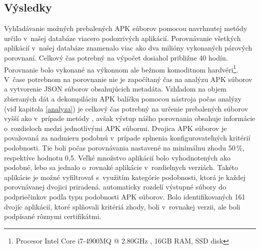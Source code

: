 \subsection{Výsledky}
Vyhľadávanie možných prebalených APK súborov pomocou navrhnutej metódy určilo v~našej databáze viacero podozrivých aplikácií. Porovnávanie všetkých aplikácií v~našej databáze znamenalo viac ako dva milióny vykonaných párových porovnaní. Celkový čas potrebný na výpočet dosiahol približne 40 hodín. Porovnanie bolo vykonané na výkonnom ale bežnom komoditnom hardvéri\footnote{Procesor Intel Core i7-4900MQ @ 2.80GHz , 16GB RAM, SSD disk}. V~čase potrebnom na porovnanie nie je započítaný čas na analýzu APK súborov a vytvorenie JSON súborov obsahujúcich metadáta. Vzhľadom na objem zbieraných dát a dekompiláciu APK balíčku pomocou nástroja  počas analýzy (viď kapitola \ref{analyza}) je celkový čas potrebný na určenie prebalených súborov vyšší ako v~prípade metódy , avšak výstup nášho porovnania obsahuje informácie o~rozdieloch medzi jednotlivými APK súbormi. Dvojica APK súborov je považovaná za nadmieru podobnú v~prípade splnenia konfigurovateľných kritérií podobnosti. Tie boli počas porovnávania nastavené na minimálnu zhodu 50\,\%, respektíve hodnotu  0,5. Veľké množstvo aplikácií bolo vyhodnotených ako podobné, lebo sa jednalo o~rovnaké aplikácie v~rozdielnych verziách. Takéto aplikácie je možné vyfiltrovať s~využitím kategórie podobnosti, ktorá je každej porovnávanej dvojici priradená.  automaticky rozdelí výstupné súbory do podpriečinkov podľa typu podobnosti APK súborov. Bolo identifikovaných 161 dvojíc aplikácií, ktoré splňovali kritériá zhody, boli v~rovnakej verzii, ale boli podpísané rôznymi certifikátmi.